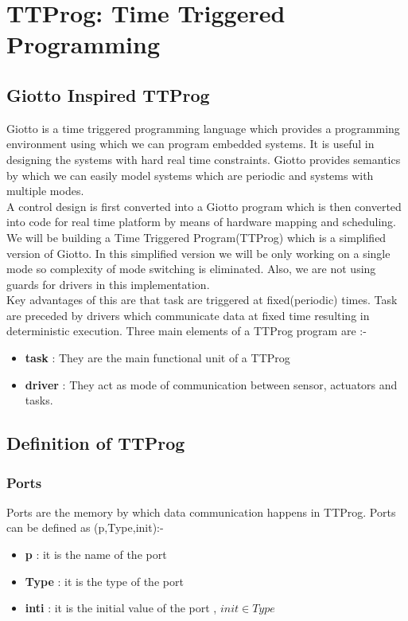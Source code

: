 \documentclass[16pt]{report}
\begin{document}
\chapter{TTProg: Time Triggered Programming}


\section{Giotto Inspired TTProg}
Giotto \cite{giotto} is a time triggered programming language which provides a programming environment using which we can program embedded systems. It is useful in designing the systems with hard real time constraints. Giotto provides semantics by which we can easily model systems which are periodic and systems with multiple modes. \\
A control design is first converted into a Giotto program which is then converted into code for real time platform by means of hardware mapping and scheduling. \\
We will be building a Time Triggered Program(TTProg) which is a simplified version of Giotto. In this simplified version we will be only working on a single mode so complexity of mode switching is eliminated. Also, we are not using guards for drivers in this implementation.\\
Key advantages of this are that task are triggered at fixed(periodic) times. Task are preceded by drivers which communicate data at fixed time resulting in deterministic execution.
Three main elements of a TTProg program are :- 
\begin{itemize}
    \item \textbf{task} : They are the main functional unit of a TTProg 
    \item \textbf{driver} : They act as mode of communication between sensor, actuators and tasks.
\end{itemize}{}

\section{Definition of TTProg}

\subsection{Ports}

Ports are the memory by which data communication happens in TTProg.
Ports can be defined as (p,Type,init):-
\begin{itemize}
    \item \textbf{p} : it is the name of the port
    \item \textbf{Type} : it is the type of the port
    \item \textbf{inti} : it is the initial value of the port , $ init \in Type$
\end{itemize}
  
\end{document}
